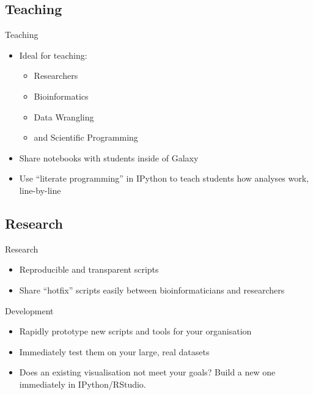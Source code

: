\documentclass[12pt]{beamer} %
\begin{document}
  \subsection{Teaching}
  \begin{frame}{Teaching}
    \begin{itemize}
      \item Ideal for teaching:
      	\begin{itemize}
          \item Researchers
          \item Bioinformatics
          \item Data Wrangling
          \item and Scientific Programming
        \end{itemize}
      \item Share notebooks with students inside of Galaxy
      \item Use ``literate programming'' in IPython to teach students how analyses work, line-by-line
    \end{itemize}
  \end{frame}
  
  \subsection{Research}
  \begin{frame}{Research}
    \begin{itemize}
      \item Reproducible and transparent scripts
      \item Share ``hotfix'' scripts  easily between bioinformaticians and researchers
    \end{itemize}
  \end{frame}

  \begin{frame}{Development}
    \begin{itemize}
      \item	Rapidly prototype new scripts and tools for your organisation
      \item Immediately test them on your large, real datasets 
      \item Does an existing visualisation not meet your goals? Build a new one immediately in IPython/RStudio.
    \end{itemize}
  \end{frame}
  
\end{document}
